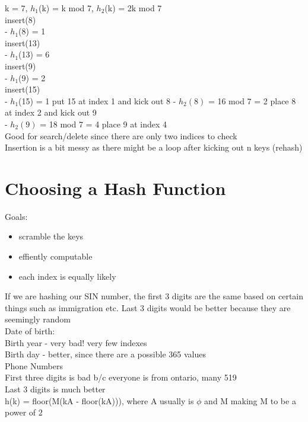 \documentclass[12pt]{article}
\begin{document}
	k = 7, $h_1$(k) = k mod 7, $h_2$(k) = 2k mod 7\\
	
	insert(8)\\
	- $h_1$(8) = 1\\
	insert(13)\\
	- $h_1$(13) = 6\\
	insert(9)\\
	- $h_1$(9) = 2\\
	insert(15)\\
	- $h_1$(15) = 1 put 15 at index 1 and kick out 8
	- $h_2(8)$ = 16 mod 7 = 2 place 8 at index 2 and kick out 9\\
	- $h_2(9)$ = 18 mod 7 = 4 place 9 at index 4\\
	
	Good for search/delete since there are only two indices to check\\
	Insertion is a bit messy as there might be a loop after kicking out n keys (rehash)\\
	
	\section*{Choosing a Hash Function}
	Goals:
	\begin{itemize}
		\item scramble the keys
		\item effiently computable
		\item each index is equally likely
	\end{itemize}
	
	If we are hashing our SIN number, the first 3 digits are the same based on certain things such as immigration etc. Last 3 digits would be better because they are seemingly random\\
	
	Date of birth:\\
	Birth year - very bad! very few indexes\\
	Birth day - better, since there are a possible 365 values\\
	
	Phone Numbers\\
	First three digits is bad b/c everyone is from ontario, many 519\\
	Last 3 digits is much better\\
	
	h(k) = floor(M(kA - floor(kA))), where A usually is $\phi$ and M making M to be a power of 2\\
	
\end{document}
